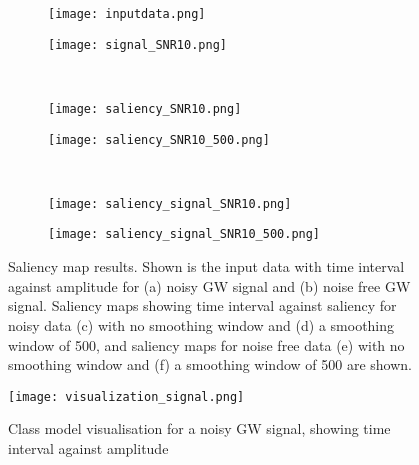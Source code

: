 \documentclass[12pt, letterpaper, twoside]{article}
\begin{document}
\begin{figure}
\begin{subfigure}[b]{0.5\textwidth}
\texttt{[image: inputdata.png]}
  \label{fig:input}
  \caption{}
\end{subfigure}
\begin{subfigure}[b]{0.5\textwidth}
\texttt{[image: signal\_SNR10.png]}
  \label{fig:signal}
  \caption{}
\end{subfigure}
\\
\begin{subfigure}[b]{0.5\textwidth}
\texttt{[image: saliency\_SNR10.png]}
  \label{fig:saliency0}
  \caption{}
\end{subfigure}
\begin{subfigure}[b]{0.5\textwidth}
\texttt{[image: saliency\_SNR10\_500.png]}
  \label{fig:saliency500}
  \caption{}
\end{subfigure}
\\
\begin{subfigure}[b]{0.5\textwidth}
\texttt{[image: saliency\_signal\_SNR10.png]}
  \label{fig:saliencysignal0}
  \caption{}
\end{subfigure}
\begin{subfigure}[b]{0.5\textwidth}
\texttt{[image: saliency\_signal\_SNR10\_500.png]}
  \label{fig:saliencysignal500}
  \caption{}
\end{subfigure}

\caption{Saliency map results. Shown is the input data with time interval against amplitude for (a) noisy GW signal and (b) noise free GW signal. Saliency maps showing time interval against saliency for noisy data (c) with no smoothing window and (d) a smoothing window of 500, and saliency maps for noise free data (e) with no smoothing window and (f) a smoothing window of 500 are shown.}
\label{Saliency}
\end{figure}
\begin{figure}[h]
\begin{center}
\texttt{[image: visualization\_signal.png]}
\label{fig:visualisation}
\caption{Class model visualisation for a noisy GW signal, showing time interval against amplitude}
\end{center}
\end{figure}
\end{document}
